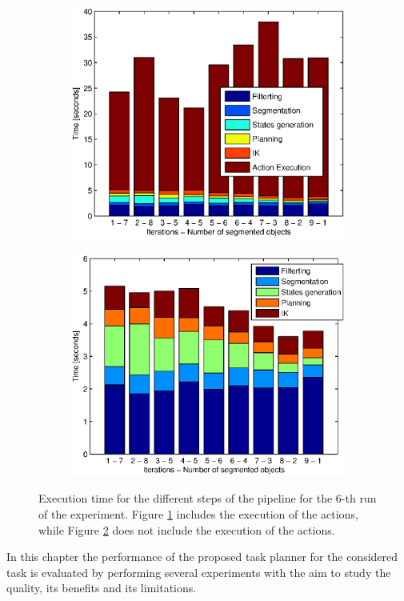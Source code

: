 \begin{figure}
\centering
\begin{subfigure}[t]{0.48\textwidth}
\centering
\includegraphics[width=9.1cm]{Img/experiments/exp_good/data/exp_times_with_actions.eps}
\caption{}\label{fig:run6_time_actions}
\end{subfigure}
\begin{subfigure}[t]{0.48\textwidth}
\centering
\includegraphics[width=9.5cm]{Img/experiments/exp_good/data/exp_times_no_actions.eps}
\caption{}  \label{fig:run6_time_no_actions}
\end{subfigure}
\caption{Execution time for the different steps of the pipeline for the $6$-th run of the experiment. Figure \ref{fig:run6_time_actions} includes the execution of the actions, while Figure \ref{fig:run6_time_no_actions} does not include the execution of the actions. }\label{fig:run6_time}
\end{figure}


\iffalse
In this chapter the performance of the proposed task planner for the considered task is evaluated by performing several experiments with the aim to study the quality, its benefits and its limitations.

